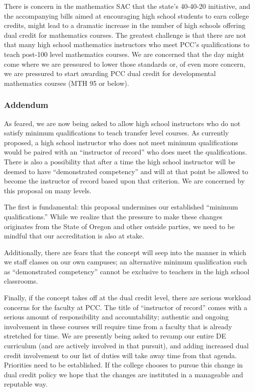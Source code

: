 There is concern in the mathematics SAC that the state's 40-40-20 initiative,
and the accompanying bills aimed at encouraging high school students to earn
college credits, might lead to a dramatic increase in the number of high
schools offering dual credit for mathematics courses. The greatest challenge is
that there are not that many high school mathematics instructors who meet PCC's
qualifications to teach post-100 level mathematics courses.  We are concerned
that the day might come where we are pressured to lower those standards or, of
even more concern, we are pressured to start awarding PCC dual credit for
developmental mathematics courses (MTH 95 or below).

\subsubsection{Addendum}
As feared, we are now being asked to allow high school instructors who do not satisfy minimum
qualifications to teach transfer level courses. As currently proposed, a high
school instructor who does not meet minimum qualifications would be paired with
an ``instructor of record'' who does meet the qualifications.  There is also a
possibility that after a time the high school instructor will be deemed to have
``demonstrated competency'' and will at that point be allowed to become the
instructor of record based upon that criterion.  We are concerned by this
proposal on many levels.

The first is fundamental: this proposal undermines our established ``minimum qualifications.''
While we realize that the pressure to make these changes originates from the State of Oregon and other outside parties, we
need to be mindful that our accreditation is also at stake.

Additionally, there are fears that the concept will seep into the manner in which we staff classes
on our own campuses; an alternative minimum qualification such as ``demonstrated competency''
cannot be exclusive to teachers in the high school classrooms.

Finally, if the concept takes off at the dual credit level, there are serious workload concerns
for the faculty at PCC. The title of ``instructor of record'' comes with a serious amount of
responsibility and accountability; authentic and ongoing involvement in these courses will
require time from a faculty that is already stretched for time. We are presently being asked
to revamp our entire DE curriculum (and are actively involved in that pursuit), and adding
increased dual credit involvement to our list of duties will take away time from that agenda.
Priorities need to be established. If the college chooses to pursue this change in dual credit
policy we hope that the changes are instituted in a manageable and reputable way.

